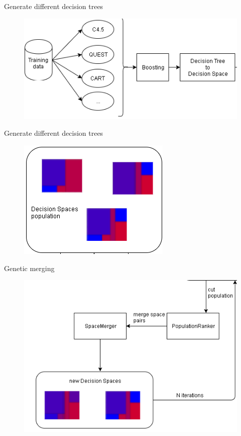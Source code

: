 \documentclass[english]{beamer}
\begin{document}
\begin{frame}{Generate different decision trees}
	\begin{figure}
		\centering
		\includegraphics[scale=0.8]{figures/generate_dt.png}
	\end{figure}	
\end{frame}

\begin{frame}{Generate different decision trees}
	\begin{figure}
		\centering
		\includegraphics[scale=1]{figures/dt_population.png}
	\end{figure}	
\end{frame}

{
\begin{frame}{Genetic merging}
	\begin{figure}
		\centering
		\includegraphics[scale=0.7]{figures/genetic_merging.png}
	\end{figure}
\end{frame} }
\end{document}
